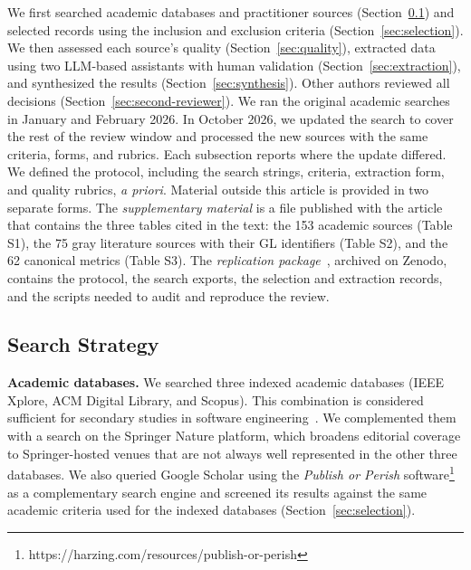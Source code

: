 \documentclass[preprint,number]{elsarticle}
\begin{document}
We first searched academic databases and practitioner sources (Section~\ref{sec:search}) and selected records using the inclusion and exclusion criteria (Section~\ref{sec:selection}). We then assessed each source's quality (Section~\ref{sec:quality}), extracted data using two LLM-based assistants with human validation (Section~\ref{sec:extraction}), and synthesized the results (Section~\ref{sec:synthesis}). Other authors reviewed all decisions (Section~\ref{sec:second-reviewer}). We ran the original academic searches in January and February 2026. In October 2026, we updated the search to cover the rest of the review window and processed the new sources with the same criteria, forms, and rubrics. Each subsection reports where the update differed. We defined the protocol, including the search strings, criteria, extraction form, and quality rubrics, \textit{a priori}. Material outside this article is provided in two separate forms. The \textit{supplementary material} is a file published with the article that contains the three tables cited in the text: the 153 academic sources (Table S1), the 75 gray literature sources with their GL identifiers (Table S2), and the 62 canonical metrics (Table S3). The \textit{replication package}~\cite{replication2026}, archived on Zenodo, contains the protocol, the search exports, the selection and extraction records, and the scripts needed to audit and reproduce the review.

\subsection{Search Strategy}
\label{sec:search}

\textbf{Academic databases.}
We searched three indexed academic databases (IEEE Xplore, ACM Digital Library, and Scopus). This combination is considered sufficient for secondary studies in software engineering~\cite{garousi2019mlr}. We complemented them with a search on the Springer Nature platform, which broadens editorial coverage to Springer-hosted venues that are not always well represented in the other three databases. We also queried Google Scholar using the \textit{Publish or Perish} software\footnote{https://harzing.com/resources/publish-or-perish} as a complementary search engine and screened its results against the same academic criteria used for the indexed databases (Section~\ref{sec:selection}).
\end{document}
